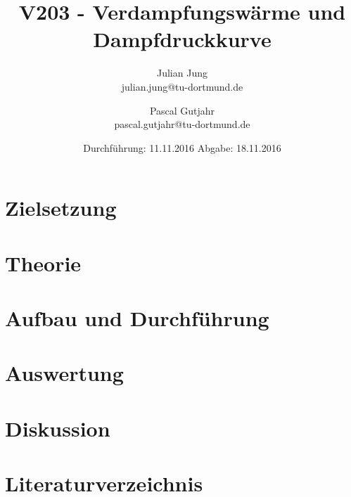 

\title{V203 - Verdampfungswärme und Dampfdruckkurve}
\author{Julian Jung \\ julian.jung@tu-dortmund.de
  \and Pascal Gutjahr \\ pascal.gutjahr@tu-dortmund.de}
  \date{Durchführung: 11.11.2016
  \hspace{3em}
  Abgabe: 18.11.2016}
  
\maketitle
\newpage
\tableofcontents
\newpage
\section{Zielsetzung}
\section{Theorie}
\section{Aufbau und Durchführung}
\section{Auswertung}

\newpage
\section{Diskussion}
\section{Literaturverzeichnis}

